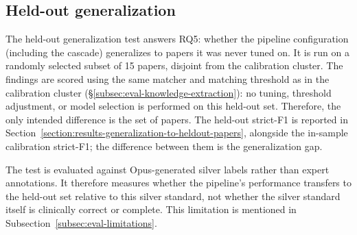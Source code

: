 \subsection{Held-out generalization}\label{subsec:eval-heldout-generalization}

The held-out generalization test answers RQ5: whether the pipeline configuration (including the cascade) generalizes to papers it was never tuned on. It is run on a randomly selected subset of 15 papers, disjoint from the calibration cluster. The findings are scored using the same matcher and matching threshold as in the calibration cluster (§\ref{subsec:eval-knowledge-extraction}): no tuning, threshold adjustment, or model selection is performed on this held-out set. Therefore, the only intended difference is the set of papers. The held-out strict-F1 is reported in Section~\ref{section:results-generalization-to-heldout-papers}, alongside the in-sample calibration strict-F1; the difference between them is the generalization gap.

The test is evaluated against Opus-generated silver labels rather than expert annotations. It therefore measures whether the pipeline's performance transfers to the held-out set relative to this silver standard, not whether the silver standard itself is clinically correct or complete. This limitation is mentioned in Subsection~\ref{subsec:eval-limitations}.